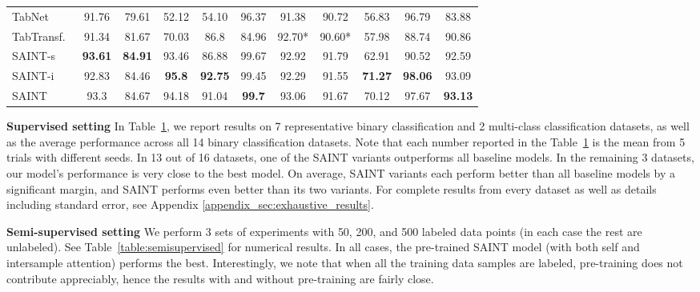 \documentclass{article}
\begin{document}
\begin{table}[t!]
{\begin{tabular}{l | c c c c c c c c c | c }
TabNet~\citep{arik2019TabNet}                    & 91.76 & 79.61   & 52.12    & 54.10 & 96.37 & 91.38  & 90.72 & 56.83            & 96.79          & 83.88   \\
TabTransf.~\citep{huang2020tabtransformer}            & 91.34   & 81.67     & 70.03      & 86.8    & 84.96   & 92.70*   & 90.60*  & 57.98            & 88.74          & 90.86   \\
\midrule
SAINT-s                   & \textbf{93.61}   & \textbf{84.91}     & 93.46      & 86.88   & 99.67   & 92.92    & 91.79   & 62.91            & 90.52          & 92.59   \\
SAINT-i                   & 92.83   & 84.46     & \textbf{95.8}       & \textbf{92.75}   & 99.45   & 92.29    & 91.55   & \textbf{71.27}            & \textbf{98.06 }         & 93.09   \\
SAINT                     & 93.3    & 84.67     & 94.18      & 91.04   & \textbf{99.7 }   & 93.06    & 91.67   & 70.12            & 97.67          & \textbf{93.13}   \\
\bottomrule
\end{tabular}
}

\label{table:supervised_results}
\end{table}


\textbf{Supervised setting} In Table~\ref{table:supervised_results}, we report results on 7 representative binary classification and 2 multi-class classification datasets, as well as the average performance across all 14 binary classification datasets. Note that each number reported in the Table~\ref{table:supervised_results} is the mean from 5 trials with different seeds. In 13 out of 16 datasets, one of the SAINT variants outperforms all baseline models. In the remaining 3 datasets, our model's performance is very close to the best model. On average, SAINT variants each perform better than all baseline models by a significant margin, and SAINT performs even better than its two variants. For complete results from every dataset as well as details including standard error, see Appendix \ref{appendix_sec:exhaustive_results}.


\textbf{Semi-supervised setting}  We perform 3 sets of experiments with 50, 200, and 500 labeled data points (in each case the rest are unlabeled). See Table~\ref{table:semisupervised} for numerical results. In all cases, the pre-trained SAINT model (with both self and intersample attention) performs the best. Interestingly, we note that when all the training data samples are labeled, pre-training does not contribute appreciably, hence the results with and without pre-training are fairly close. 
\end{document}
